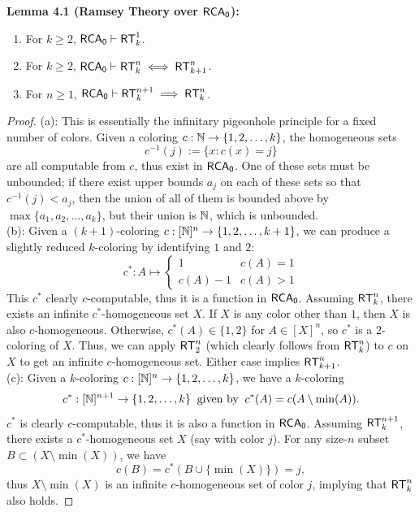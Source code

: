 \documentclass{amsart}
\begin{document}
	\noindent \textbf{Lemma 4.1 (Ramsey Theory over $\operatorname{\sf{RCA_0}}$):} 
	\begin{enumerate}[label=(\alph*)]
		\item For $k\geq 2$, $\operatorname{\sf{RCA_0}}\vdash \operatorname{\sf{RT}}^1_k$.
		\item For $k\geq 2$, $\operatorname{\sf{RCA_0}}\vdash \operatorname{\sf{RT}}^n_k\iff \operatorname{\sf{RT}}^n_{k+1}$.
		\item For $n\geq 1$, $\operatorname{\sf{RCA_0}}\vdash \operatorname{\sf{RT}}^{n+1}_k \implies \operatorname{\sf{RT}}^{n}_k$.
	\end{enumerate}
	\begin{proof} (a): This is essentially the infinitary pigeonhole principle for a fixed number of colors. Given a coloring $c:\mathbb{N}\to \{1,2,\dots,k\}$, the homogeneous sets $$c^{-1}(j):=\{x:c(x)=j\}$$
		are all computable from $c$, thus exist in $\operatorname{\sf{RCA_0}}$. One of these sets must be unbounded; if there exist upper bounds $a_j$ on each of these sets so that $c^{-1}(j) < a_j$, then the union of all of them is bounded above by $\max\{a_1,a_2,\dots,a_k\}$, but their union is $\mathbb{N}$, which is unbounded.\\
		
		(b): Given a $(k+1)$-coloring  $c:[\mathbb{N}]^n\to \{1,2,\dots,k+1\}$, we can produce a slightly reduced $k$-coloring by identifying $1$ and $2$:
		$$c^*: A \mapsto \begin{cases}
			1 & c(A)=1\\
			c(A)-1 & c(A) >1
		\end{cases}$$ 
		This $c^*$ clearly $c$-computable, thus it is a function in $\operatorname{\sf{RCA_0}}$. Assuming $\operatorname{\sf{RT}}^n_k$, there exists an infinite $c^*$-homogeneous set $X$. If $X$ is any color other than $1$, then $X$ is also $c$-homogeneous. Otherwise, $c^*(A)\in \{1,2\}$ for $A\in [X]^n$, so $c^*$ is a 2-coloring of $X$. Thus, we can apply $\operatorname{\sf{RT}}^n_2$ (which clearly follows from $\operatorname{\sf{RT}}^n_k$) to $c$ on $X$ to get an infinite $c$-homogeneous set. Either case implies $\operatorname{\sf{RT}}^n_{k+1}$.\\
		
		(c): Given a $k$-coloring $c:[\mathbb{N}]^n\to \{1,2,\dots,k\}$, we have a $k$-coloring 
		$$c^*:[\mathbb{N}]^{n+1}\to\{1,2,\dots,k\} \;\; \text{given by}  \;\; c^*(A)=c(A\setminus \min(A)).$$
		$c^*$ is clearly $c$-computable, thus it is also a function in $\operatorname{\sf{RCA_0}}$. Assuming $\operatorname{\sf{RT}}^{n+1}_k$, there exists a $c^*$-homogeneous set $X$ (say with color $j$). For any size-$n$ subset $B\subset (X\setminus \min(X))$, we have
		$$
		c(B) = c^*(B\cup \{\min(X)\}) = j,
		$$
		thus $X\setminus \min(X)$ is an infinite $c$-homogeneous set of color $j$, implying that $\operatorname{\sf{RT}}^n_k$ also holds.
	\end{proof}\\
	
\end{document}
